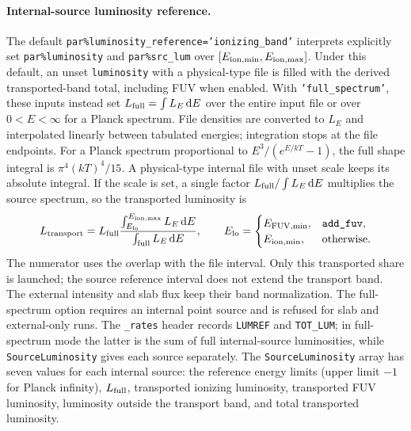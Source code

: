 \documentclass[english,a4paper]{my_memo}
\newcommand{\code}[1]{\texttt{#1}}
\begin{document}
\paragraph{Internal-source luminosity reference.}
The default \code{par\%luminosity\_reference='ionizing\_band'}
interprets explicitly set \code{par\%luminosity} and
\code{par\%src\_lum} over
$[E_{\rm ion,min},E_{\rm ion,max}]$.  Under this default, an unset
\code{luminosity} with a physical-type file is filled with the
derived transported-band total, including FUV when enabled.  With
\code{'full\_spectrum'},
these inputs instead set $L_{\rm full}=\int L_E\,\mathrm{d}E$ over the
entire input file or over $0<E<\infty$ for a Planck spectrum.  File
densities are converted to $L_E$ and interpolated linearly between
tabulated energies; integration stops at the file endpoints.  For a
Planck spectrum proportional to $E^3/(e^{E/kT}-1)$, the full shape
integral is $\pi^4(kT)^4/15$.  A physical-type internal file with
unset scale keeps its absolute integral.  If the scale is set, a
single factor $L_{\rm full}/\int L_E\,\mathrm{d}E$ multiplies the
source spectrum, so the transported luminosity is
\begin{equation}
 L_{\rm transport}=L_{\rm full}
 \frac{\int_{E_{\rm lo}}^{E_{\rm ion,max}} L_E\,\mathrm{d}E}
      {\int_{\rm full}L_E\,\mathrm{d}E},
 \qquad E_{\rm lo}=\begin{cases}
 E_{\rm FUV,min},&\code{add\_fuv},\\
 E_{\rm ion,min},&\text{otherwise}.
 \end{cases}
\end{equation}
The numerator uses the overlap with the file interval.  Only this
transported share is launched; the source reference interval does not
extend the transport band.  The external intensity and slab flux keep
their band normalization.  The full-spectrum option requires an
internal point source and is refused for slab and external-only runs.
The \code{\_rates} header records \code{LUMREF} and \code{TOT\_LUM};
in full-spectrum mode the latter is the sum of full internal-source
luminosities, while \code{SourceLuminosity} gives each source separately.
The \code{SourceLuminosity} array has seven values for each internal source:
the reference energy limits (upper limit $-1$ for Planck infinity),
$L_{\rm full}$, transported ionizing luminosity, transported FUV
luminosity, luminosity outside the transport band, and total
transported luminosity.
\end{document}
